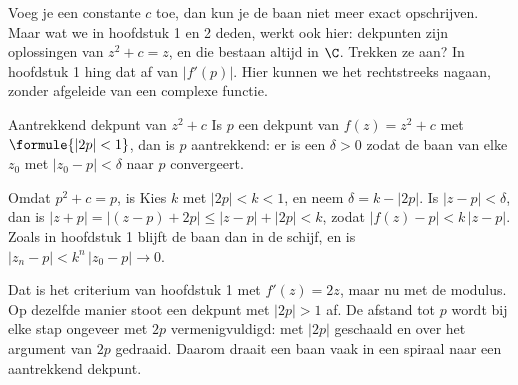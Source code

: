 Voeg je een constante $c$ toe, dan kun je de baan niet meer exact opschrijven. Maar wat we in hoofdstuk 1 en 2 deden, werkt ook hier: dekpunten zijn oplossingen van $z^2 + c = z$, en die bestaan altijd in $\C$. Trekken ze aan? In hoofdstuk 1 hing dat af van $|f'(p)|$. Hier kunnen we het rechtstreeks nagaan, zonder afgeleide van een complexe functie.

\begin{theorie}
\begin{stelling}{Aantrekkend dekpunt van $z^2 + c$}
Is $p$ een dekpunt van $f(z) = z^2 + c$ met $\formule{|2p| < 1}$, dan is $p$ aantrekkend: er is een $\delta > 0$ zodat de baan van elke $z_0$ met $|z_0 - p| < \delta$ naar $p$ convergeert.
\end{stelling}

\begin{bewijs}
Omdat $p^2 + c = p$, is
Kies $k$ met $|2p| < k < 1$, en neem $\delta = k - |2p|$. Is $|z - p| < \delta$, dan is $|z + p| = |(z - p) + 2p| \leqslant |z - p| + |2p| < k$, zodat $|f(z) - p| < k\,|z - p|$. Zoals in hoofdstuk 1 blijft de baan dan in de schijf, en is $|z_n - p| < k^n\,|z_0 - p| \to 0$.
\end{bewijs}
\end{theorie}

Dat is het criterium van hoofdstuk 1 met $f'(z) = 2z$, maar nu met de modulus. Op dezelfde manier stoot een dekpunt met $|2p| > 1$ af. De afstand tot $p$ wordt bij elke stap ongeveer met $2p$ vermenigvuldigd: met $|2p|$ geschaald en over het argument van $2p$ gedraaid. Daarom draait een baan vaak in een spiraal naar een aantrekkend dekpunt.


